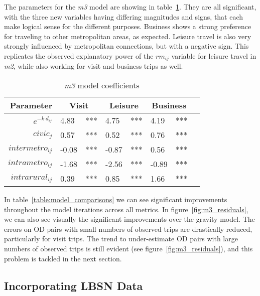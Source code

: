 The parameters for the \textit{m3} model are showing in table~\ref{table:m3-coeff}. They are all significant, with the three new variables having differing magnitudes and signs, that each make logical sense for the different purposes. Business shows a strong preference for traveling to other metropolitan areas, as expected. Leisure travel is also very strongly influenced by metropolitan connections, but with a negative sign. This replicates the observed explanatory power of the $rm_{ij}$ variable for leisure travel in \textit{m2}, while also working for visit and business trips as well.


\begin{table}[H]
\centering
\caption{\textit{m3} model coefficients}
\label{table:m3-coeff}
\begin{tabular}{@{}rlrlrlrl@{}}
  \toprule
 Parameter & \multicolumn{2}{c}{Visit} & \multicolumn{2}{c}{Leisure} & \multicolumn{2}{c}{Business} &  \\ \midrule
  $e^{-k\ d_{ij}}$ 	& 4.83 & *** & 4.75 & *** & 4.19 & *** \\  
  $civic_j$ & 0.57 & *** & 0.52 & *** & 0.76 & *** \\ 
  $intermetro_{ij}$ & -0.08 & *** & -0.87 & *** & 0.56 & *** \\ 
  $intrametro_{ij}$ & -1.68 & *** & -2.56 & *** & -0.89 & *** \\  
  $intrarural_{ij}$ & 0.39 & *** & 0.85 & *** & 1.66 & *** \\ 
   \bottomrule
\end{tabular}
\end{table}

In table~\ref{table:model_comparisons} we can see significant improvements throughout the model iterations across all metrics. In figure~\ref{fig:m3_residuals}, we can also see visually the significant improvements over the gravity model. The errors on OD pairs with small numbers of observed trips are drastically reduced, particularly for visit trips. The trend to under-estimate OD pairs with large numbers of observed trips is still evident (see figure~\ref{fig:m3_residuals}), and this problem is tackled in the next section. 


\subsection{Incorporating LBSN Data}

